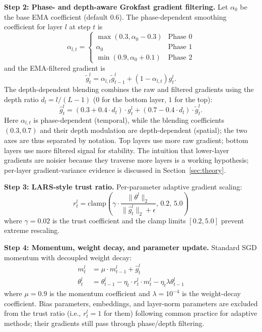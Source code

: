 \documentclass[a4paper,fleqn]{cas-dc}
\begin{document}
\textbf{Step 2: Phase- and depth-aware Grokfast gradient filtering.} Let $\alpha_0$ be the base EMA coefficient (default $0.6$). The phase-dependent smoothing coefficient for layer $l$ at step $t$ is
\begin{equation}\label{eq:dals_alpha}
\alpha_{l,t} = \begin{cases} \max(0.3, \alpha_0 - 0.3) & \text{Phase 0} \\ \alpha_0 & \text{Phase 1} \\ \min(0.9, \alpha_0 + 0.1) & \text{Phase 2} \end{cases}
\end{equation}
and the EMA-filtered gradient is
\begin{equation}\label{eq:dals_ema}
\tilde{g}_t^l = \alpha_{l,t} \tilde{g}_{t-1}^l + (1 - \alpha_{l,t}) g_t^l.
\end{equation}
The depth-dependent blending combines the raw and filtered gradients using the depth ratio $d_l = l / (L-1)$ ($0$ for the bottom layer, $1$ for the top):
\begin{equation}\label{eq:dals_blend}
\hat{g}_t^l = (0.3 + 0.4 \cdot d_l) \cdot g_t^l + (0.7 - 0.4 \cdot d_l) \cdot \tilde{g}_t^l.
\end{equation}
Here $\alpha_{l,t}$ is phase-dependent (temporal), while the blending coefficients $(0.3, 0.7)$ and their depth modulation are depth-dependent (spatial); the two axes are thus separated by notation. Top layers use more raw gradient; bottom layers use more filtered signal for stability. The intuition that lower-layer gradients are noisier because they traverse more layers is a working hypothesis; per-layer gradient-variance evidence is discussed in Section~\ref{sec:theory}.

\textbf{Step 3: LARS-style trust ratio.} Per-parameter adaptive gradient scaling:
\begin{equation}\label{eq:dals_trust}
r_t^l = \mathrm{clamp}\left(\gamma \cdot \frac{\|\theta^l\|_2}{\|\hat{g}_t^l\|_2 + \epsilon}, \, 0.2, \, 5.0\right)
\end{equation}
where $\gamma = 0.02$ is the trust coefficient and the clamp limits $[0.2, 5.0]$ prevent extreme rescaling.

\textbf{Step 4: Momentum, weight decay, and parameter update.} Standard SGD momentum with decoupled weight decay:
\begin{align}
m_t^l &= \mu \cdot m_{t-1}^l + \hat{g}_t^l \label{eq:dals_momentum}\\
\theta_t^l &= \theta_{t-1}^l - \eta_t \cdot r_t^l \cdot m_t^l - \eta_t \lambda \theta_{t-1}^l \label{eq:dals_update}
\end{align}
where $\mu=0.9$ is the momentum coefficient and $\lambda=10^{-4}$ is the weight-decay coefficient. Bias parameters, embeddings, and layer-norm parameters are excluded from the trust ratio (i.e., $r_t^l=1$ for them) following common practice for adaptive methods; their gradients still pass through phase/depth filtering.
\end{document}
